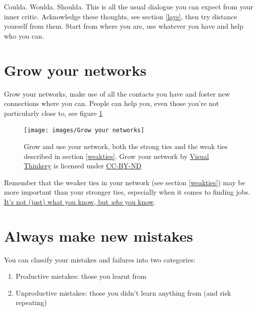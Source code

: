 \documentclass[
]{book}
\providecommand{\tightlist}{%
  \setlength{\itemsep}{0pt}\setlength{\parskip}{0pt}}
\begin{document}
Coulda. Woulda. Shoulda. This is all the usual dialogue you can expect from your inner critic. Acknowledge these thoughts, see section \ref{lays}, then try distance yourself from them. Start from where you are, use whatever you have and help who you can.

\hypertarget{networking}{%
\section{Grow your networks}\label{networking}}

Grow your networks, make use of all the contacts you have and foster new connections where you can. People can help you, even those you're not particularly close to, see figure \ref{fig:yournetwork-fig}

\begin{figure}

{\centering \texttt{[image: images/Grow your networks]} 

}

\caption{Grow and use your network, both the strong ties and the weak ties described in section \ref{weakties}. Grow your network by \href{https://visualthinkery.com}{Visual Thinkery} is licensed under \href{https://creativecommons.org/licenses/by-nd/4.0/}{CC-BY-ND}}\label{fig:yournetwork-fig}
\end{figure}



Remember that the weaker ties in your network (see section \ref{weakties}) may be more important than your stronger ties, especially when it comes to finding jobs. \href{https://en.wiktionary.org/wiki/it\%27s_not_what_you_know_but_who_you_know}{It's not (just) what you know, but \emph{who} you know}.

\hypertarget{estherdyson}{%
\section{Always make new mistakes}\label{estherdyson}}

You can classify your mistakes and failures into two categories:

\begin{enumerate}
\def\labelenumi{\arabic{enumi}.}
\tightlist
\item
  Productive mistakes: those you learnt from
\item
  Unproductive mistakes: those you didn't learn anything from (and risk repeating)
\end{enumerate}
\end{document}
